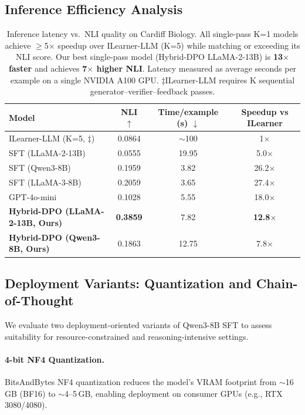 \subsection{Inference Efficiency Analysis}

\begin{table}[h]
\centering
\small
\begin{tabular}{l|c|c|c}
\toprule
Model & NLI $\uparrow$ & Time/example (s) $\downarrow$ & Speedup vs ILearner \\
\midrule
ILearner-LLM (K=5, $\ddagger$) & 0.0864 & $\sim$100 & 1$\times$ \\
\midrule
SFT (LLaMA-2-13B) & 0.0555 & 19.95 & 5.0$\times$ \\
SFT (Qwen3-8B) & 0.1959 & 3.82 & 26.2$\times$ \\
SFT (LLaMA-3-8B) & 0.2059 & 3.65 & 27.4$\times$ \\
GPT-4o-mini & 0.1028 & 5.55 & 18.0$\times$ \\
\textbf{Hybrid-DPO (LLaMA-2-13B, Ours)} & \textbf{0.3859} & 7.82 & \textbf{12.8$\times$} \\
\textbf{Hybrid-DPO (Qwen3-8B, Ours)} & 0.1863 & 12.75 & 7.8$\times$ \\
\bottomrule
\end{tabular}
\caption{Inference latency vs.\ NLI quality on Cardiff Biology. All single-pass K=1 models achieve $\geq$5$\times$ speedup over ILearner-LLM (K=5) while matching or exceeding its NLI score. Our best single-pass model (Hybrid-DPO LLaMA-2-13B) is \textbf{13$\times$ faster} and achieves \textbf{7$\times$ higher NLI}. Latency measured as average seconds per example on a single NVIDIA A100 GPU. $\ddagger$ILearner-LLM requires K sequential generator--verifier--feedback passes.}
\label{tab:latency}
\end{table}

\subsection{Deployment Variants: Quantization and Chain-of-Thought}
\label{sec:deployment}

We evaluate two deployment-oriented variants of Qwen3-8B SFT to assess suitability for resource-constrained and reasoning-intensive settings.

\paragraph{4-bit NF4 Quantization.}
BitsAndBytes NF4 quantization reduces the model's VRAM footprint from $\sim$16\,GB (BF16) to $\sim$4--5\,GB, enabling deployment on consumer GPUs (e.g., RTX 3080/4080).

